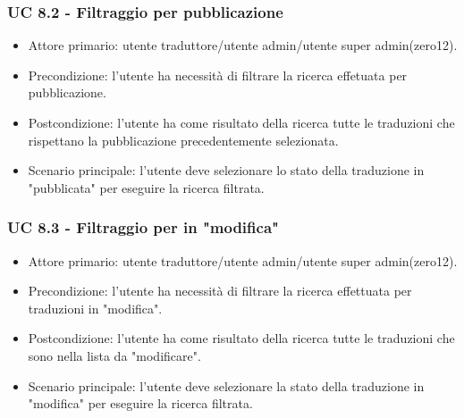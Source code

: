    \subsubsection{UC 8.2 - Filtraggio per pubblicazione}
        \begin{itemize}
            \item Attore primario: utente traduttore/utente admin/utente super admin(zero12).
            \item Precondizione: l'utente ha necessità di filtrare la ricerca effetuata per pubblicazione.
            \item Postcondizione: l'utente ha come risultato della ricerca tutte le traduzioni che rispettano la pubblicazione precedentemente selezionata. 
            \item Scenario principale: l'utente deve selezionare lo stato della traduzione in "pubblicata" per eseguire la ricerca filtrata.
        \end{itemize}
    \subsubsection{UC 8.3 - Filtraggio per in "modifica"}
        \begin{itemize}
            \item Attore primario: utente traduttore/utente admin/utente super admin(zero12).
            \item Precondizione: l'utente ha necessità di filtrare la ricerca effettuata per traduzioni in "modifica".
            \item Postcondizione: l'utente ha come risultato della ricerca tutte le traduzioni che sono nella lista da "modificare". 
            \item Scenario principale: l'utente deve selezionare la stato della traduzione in "modifica" per eseguire la ricerca filtrata.
        \end{itemize}
